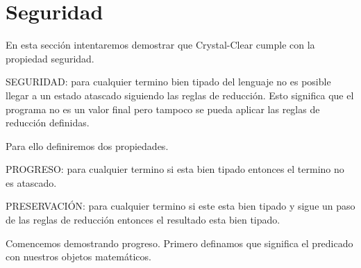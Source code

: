 \section{Seguridad}

En esta sección intentaremos demostrar que Crystal-Clear cumple con la propiedad
seguridad.

\begin{definition}
    SEGURIDAD: para cualquier termino bien tipado del lenguaje no es
    posible llegar a un estado atascado siguiendo las reglas de reducción.
     Esto significa que el programa no es un valor final pero tampoco se 
    pueda aplicar las reglas de reducción definidas.
\end{definition}

Para ello definiremos dos propiedades.

\begin{definition}
    PROGRESO: para cualquier termino si esta bien tipado entonces el termino no es atascado.
\end{definition}
\begin{definition}
    PRESERVACIÓN: para cualquier termino si este esta bien tipado y sigue un paso de las reglas
    de reducción entonces el resultado esta bien tipado.
\end{definition}

Comencemos demostrando progreso. Primero definamos que significa el predicado
con nuestros objetos matemáticos.

